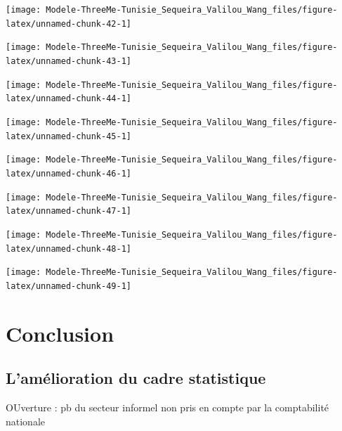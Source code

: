 \documentclass[
]{article}
\begin{document}
\begin{center}\texttt{[image: Modele-ThreeMe-Tunisie\_Sequeira\_Valilou\_Wang\_files/figure-latex/unnamed-chunk-42-1]} \end{center}

\begin{center}\texttt{[image: Modele-ThreeMe-Tunisie\_Sequeira\_Valilou\_Wang\_files/figure-latex/unnamed-chunk-43-1]} \end{center}

\begin{center}\texttt{[image: Modele-ThreeMe-Tunisie\_Sequeira\_Valilou\_Wang\_files/figure-latex/unnamed-chunk-44-1]} \end{center}

\begin{center}\texttt{[image: Modele-ThreeMe-Tunisie\_Sequeira\_Valilou\_Wang\_files/figure-latex/unnamed-chunk-45-1]} \end{center}

\begin{center}\texttt{[image: Modele-ThreeMe-Tunisie\_Sequeira\_Valilou\_Wang\_files/figure-latex/unnamed-chunk-46-1]} \end{center}

\begin{center}\texttt{[image: Modele-ThreeMe-Tunisie\_Sequeira\_Valilou\_Wang\_files/figure-latex/unnamed-chunk-47-1]} \end{center}

\begin{center}\texttt{[image: Modele-ThreeMe-Tunisie\_Sequeira\_Valilou\_Wang\_files/figure-latex/unnamed-chunk-48-1]} \end{center}

\begin{center}\texttt{[image: Modele-ThreeMe-Tunisie\_Sequeira\_Valilou\_Wang\_files/figure-latex/unnamed-chunk-49-1]} \end{center}

\hypertarget{conclusion}{%
\section{Conclusion}\label{conclusion}}

\hypertarget{lamuxe9lioration-du-cadre-statistique}{%
\subsection{L'amélioration du cadre
statistique}\label{lamuxe9lioration-du-cadre-statistique}}

OUverture : pb du secteur informel non pris en compte par la
comptabilité nationale

\printbibliography[title=Bibliography]
\end{document}
